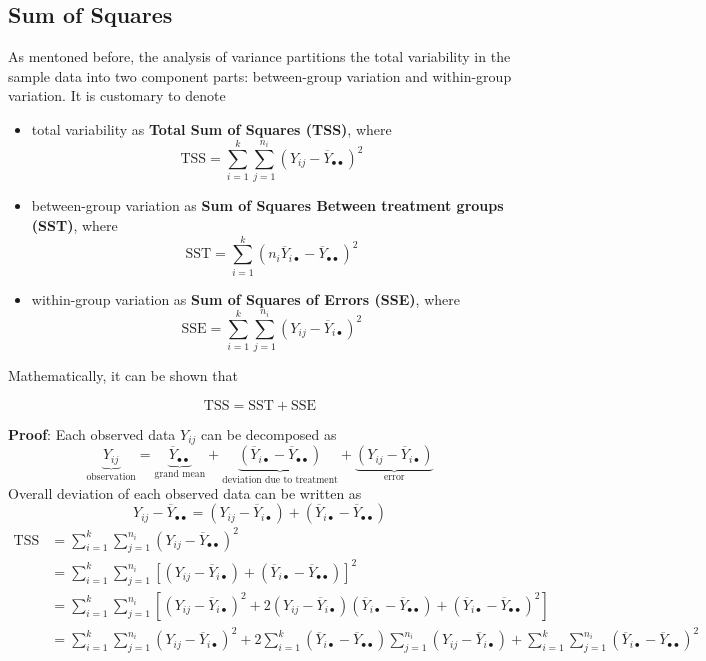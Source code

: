 \documentclass[twoside]{book}
\begin{document}
\subsection{Sum of Squares}

As mentoned before, the analysis of variance partitions the total variability in the sample data into two component parts: between-group variation and within-group variation. It is customary to denote
\begin{itemize}
\item total variability as \textbf{Total Sum of Squares (TSS)}, where
$$\text{TSS} = \sum_{i=1}^k\sum_{j=1}^{n_i} \left( Y_{ij}-\overline{Y}_{\bullet\bullet}\right)^2 $$
\item between-group variation as \textbf{Sum of Squares Between treatment groups (SST)}, where
$$\text{SST} = \sum_{i=1}^k\left(n_i \overline{Y}_{i\bullet}-\overline{Y}_{\bullet\bullet}\right)^2$$
\item within-group variation as \textbf{Sum of Squares of Errors (SSE)}, where
$$\text{SSE} = \sum_{i=1}^k\sum_{j=1}^{n_i} \left( Y_{ij}-\overline{Y}_{i\bullet}\right)^2$$
\end{itemize}
Mathematically, it can be shown that
\begin{textbox}
\begin{equation*}
\text{TSS} = \text{SST} + \text{SSE}
\end{equation*}
\end{textbox}
\textbf{Proof}: Each observed data $Y_{ij}$ can be decomposed as
\[
\underbrace{Y_{ij}}_{\text{observation}}
=
\underbrace{\overline{Y}_{\bullet\bullet}}_{\text{grand mean}}
+
\underbrace{(\overline{Y}_{i\bullet} - \overline{Y}_{\bullet\bullet})}_{\text{deviation due to treatment}}
+
\underbrace{(Y_{ij} - \overline{Y}_{i\bullet})}_{\text{error}}
\]
Overall deviation of each observed data can be written as
$$Y_{ij} - \overline{Y}_{\bullet\bullet} = \left( Y_{ij} - \overline{Y}_{i\bullet} \right)
+ \left( \overline{Y}_{i\bullet} - \overline{Y}_{\bullet\bullet} \right)$$
\begin{align*}
\text{TSS}
&= \sum_{i=1}^k \sum_{j=1}^{n_i} \left( Y_{ij} - \overline{Y}_{\bullet\bullet} \right)^2 \\
&= \sum_{i=1}^k \sum_{j=1}^{n_i}
\left[ \left( Y_{ij} - \overline{Y}_{i\bullet} \right)
+ \left( \overline{Y}_{i\bullet} - \overline{Y}_{\bullet\bullet} \right) \right]^2 \\
&= \sum_{i=1}^k \sum_{j=1}^{n_i}
\left[
\left( Y_{ij} - \overline{Y}_{i\bullet} \right)^2
+ 2\left( Y_{ij} - \overline{Y}_{i\bullet} \right)\left( \overline{Y}_{i\bullet} - \overline{Y}_{\bullet\bullet} \right)
+ \left( \overline{Y}_{i\bullet} - \overline{Y}_{\bullet\bullet} \right)^2
\right] \\
&= \sum_{i=1}^k \sum_{j=1}^{n_i} \left( Y_{ij} - \overline{Y}_{i\bullet} \right)^2
+ 2 \sum_{i=1}^k \left( \overline{Y}_{i\bullet} - \overline{Y}_{\bullet\bullet} \right)
\sum_{j=1}^{n_i} \left( Y_{ij} - \overline{Y}_{i\bullet} \right)
+ \sum_{i=1}^k \sum_{j=1}^{n_i} \left( \overline{Y}_{i\bullet} - \overline{Y}_{\bullet\bullet} \right)^2 \\
\end{align*}
\end{document}
